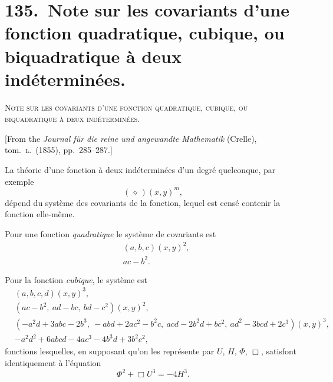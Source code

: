 \documentclass[11pt,a4paper]{article}
\begin{document}
\medskip

\small{}\normalsize

\section*{135.\ Note sur les covariants d'une fonction quadratique, cubique, ou biquadratique \`a deux ind\'etermin\'ees.}

\begin{center}\textsc{Note sur les covariants d'une fonction quadratique, cubique, ou biquadratique \`a deux ind\'etermin\'ees.}\end{center}

[From the \textit{Journal f\"ur die reine und angewandte Mathematik} (Crelle), tom.\ \textsc{l}.\ (1855), pp.\ 285--287.]

\medskip

\noindent La th\'eorie d'une fonction \`a deux ind\'etermin\'ees d'un degr\'e quelconque, par exemple
\[
(\,\diamond\,)(x,y)^m,
\]
d\'epend du syst\`eme des covariants de la fonction, lequel est cens\'e contenir la fonction elle-m\^eme.

\medskip

Pour une fonction \textit{quadratique} le syst\`eme de covariants est
\begin{align*}
& (a,b,c)(x,y)^2,\\
& ac - b^2.
\end{align*}

\medskip

Pour la fonction \textit{cubique}, le syst\`eme est
\begin{align*}
& (a,b,c,d)(x,y)^3,\\
& (ac - b^2,\ ad - bc,\ bd - c^2)(x,y)^2,\\
& (-a^2 d + 3abc - 2b^3,\ -abd + 2ac^2 - b^2 c,\ acd - 2b^2 d + bc^2,\ ad^2 - 3bcd + 2c^3)(x,y)^3,\\
& -a^2 d^2 + 6abcd - 4ac^3 - 4b^3 d + 3 b^2 c^2,
\end{align*}
fonctions lesquelles, en supposant qu'on les repr\'esente par $U$, $H$, $\Phi$, $\Box$, satisfont identiquement \`a l'\'equation
\[
\Phi^2 + \Box U^3 = -4 H^3.
\]
\end{document}
